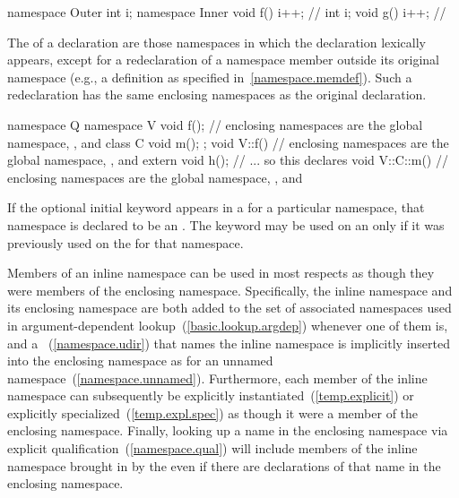 \begin{codeblock}
namespace Outer {
  int i;
  namespace Inner {
    void f() { i++; }           // 
    int i;
    void g() { i++; }           // 
  }
}
\end{codeblock}
\exitexample

\pnum
The  of a declaration are those
namespaces in which the declaration lexically appears, except for a
redeclaration of a namespace member outside its original namespace
(e.g., a definition as specified in~\ref{namespace.memdef}). Such a
redeclaration has the same enclosing namespaces as the original
declaration.
\enterexample
\begin{codeblock}
namespace Q {
  namespace V {
    void f();   // enclosing namespaces are the global namespace, , and 
    class C { void m(); };
  }
  void V::f() { // enclosing namespaces are the global namespace, , and 
    extern void h();  // ... so this declares 
  }
  void V::C::m() { // enclosing namespaces are the global namespace, , and 
  }
}
\end{codeblock}
\exitexample

\pnum
If the optional initial  keyword appears in a
 for a particular namespace, that namespace is
declared to be an . The  keyword may be
used on an  only if it was
previously used on the  for that
namespace.

\pnum
Members of an inline namespace can be used in most respects as though they were members
of the enclosing namespace. Specifically, the inline namespace and its enclosing
namespace are both added to the set of associated namespaces used in
argument-dependent lookup~(\ref{basic.lookup.argdep}) whenever one of them is,
and a ~(\ref{namespace.udir}) that names the inline
namespace is implicitly inserted into the enclosing namespace as for an unnamed
namespace~(\ref{namespace.unnamed}). Furthermore, each
member of the inline namespace can subsequently be explicitly
instantiated~(\ref{temp.explicit}) or explicitly specialized~(\ref{temp.expl.spec}) as
though it were a member of the enclosing namespace. Finally, looking up a name in the
enclosing namespace via explicit qualification~(\ref{namespace.qual}) will include
members of the inline namespace brought in by the  even if
there are declarations of that name in the enclosing namespace.

